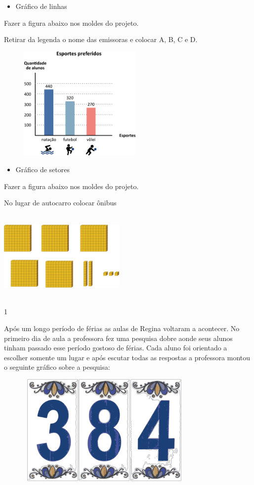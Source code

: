 \begin{escolha}
{\begin{itemize}
\item
  Gráfico de linhas
\end{itemize}

Fazer a figura abaixo nos moldes do projeto.

Retirar da legenda o nome das emissoras e colocar A, B, C e D.

\includegraphics[width=3.19872in,height=2.19483in]{media/image90.png}

\begin{itemize}
\item
  Gráfico de setores
\end{itemize}

Fazer a figura abaixo nos moldes do projeto.

No lugar de autocarro colocar ônibus

\includegraphics[width=2.42308in,height=1.74971in]{media/image91.png}}


\num{1}

Após um longo período de férias as aulas de Regina voltaram a acontecer.
No primeiro dia de aula a professora fez uma pesquisa dobre aonde seus
alunos tinham passado esse período gostoso de férias. Cada aluno foi
orientado a escolher somente um lugar e após escutar todas as respostas
a professora montou o seguinte gráfico sobre a pesquisa:

\includegraphics[width=4.23077in,height=2.15071in]{media/image92.png}


\end{escolha}
